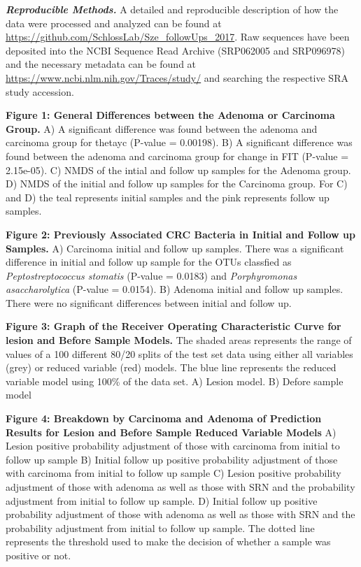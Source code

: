 \documentclass[12pt,]{article}
\begin{document}
\textbf{\emph{Reproducible Methods.}} A detailed and reproducible
description of how the data were processed and analyzed can be found at
\url{https://github.com/SchlossLab/Sze_followUps_2017}. Raw sequences
have been deposited into the NCBI Sequence Read Archive (SRP062005 and
SRP096978) and the necessary metadata can be found at
\url{https://www.ncbi.nlm.nih.gov/Traces/study/} and searching the
respective SRA study accession.

\newpage

\textbf{Figure 1: General Differences between the Adenoma or Carcinoma
Group.} A) A significant difference was found between the adenoma and
carcinoma group for thetayc (P-value = 0.00198). B) A significant
difference was found between the adenoma and carcinoma group for change
in FIT (P-value = 2.15e-05). C) NMDS of the intial and follow up samples
for the Adenoma group. D) NMDS of the initial and follow up samples for
the Carcinoma group. For C) and D) the teal represents initial samples
and the pink represents follow up samples.

\textbf{Figure 2: Previously Associated CRC Bacteria in Initial and
Follow up Samples.} A) Carcinoma initial and follow up samples. There
was a significant difference in initial and follow up sample for the
OTUs classfied as \emph{Peptostreptococcus stomatis} (P-value = 0.0183)
and \emph{Porphyromonas asaccharolytica} (P-value = 0.0154). B) Adenoma
initial and follow up samples. There were no significant differences
between initial and follow up.

\textbf{Figure 3: Graph of the Receiver Operating Characteristic Curve
for lesion and Before Sample Models.} The shaded areas represents the
range of values of a 100 different 80/20 splits of the test set data
using either all variables (grey) or reduced variable (red) models. The
blue line represents the reduced variable model using 100\% of the data
set. A) Lesion model. B) Defore sample model

\textbf{Figure 4: Breakdown by Carcinoma and Adenoma of Prediction
Results for Lesion and Before Sample Reduced Variable Models} A) Lesion
positive probability adjustment of those with carcinoma from initial to
follow up sample B) Initial follow up positive probability adjustment of
those with carcinoma from initial to follow up sample C) Lesion positive
probability adjustment of those with adenoma as well as those with SRN
and the probability adjustment from initial to follow up sample. D)
Initial follow up positive probability adjustment of those with adenoma
as well as those with SRN and the probability adjustment from initial to
follow up sample. The dotted line represents the threshold used to make
the decision of whether a sample was positive or not.
\end{document}
